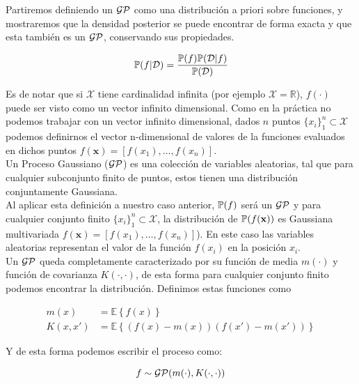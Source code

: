 Partiremos definiendo un $\mathcal{GP}$ como una distribución a priori sobre funciones, y mostraremos que la densidad posterior se puede encontrar de forma exacta y que esta también es un $\mathcal{GP}$, conservando sus propiedades.

\begin{equation}
	\mathbb{P}(f|\mathcal{D}) =  \frac{\mathbb{P}(f)\mathbb{P}(\mathcal{D}|f)}{\mathbb{P}(\mathcal{D})}
\end{equation}

Es de notar que si $\mathcal{X}$ tiene cardinalidad infinita (por ejemplo $\mathcal{X}=\mathbb{R}$), $f(\cdot)$ puede ser visto como un vector infinito dimensional. Como en la práctica no podemos trabajar con un vector infinito dimensional, dados $n$ puntos $\{ x_i\}_{1}^{n}  \subset \mathcal{X}$ podemos definirnos el vector n-dimensional de valores de la funciones evaluados en dichos puntos $f(\mathbf{x})=[f(x_1), \ldots, f(x_n)]$.\\


 Un Proceso Gaussiano ($\mathcal{GP}$) es una colección de variables aleatorias, tal que para cualquier subconjunto finito de puntos, estos tienen una distribución conjuntamente Gaussiana.\\ 

Al aplicar esta definición a nuestro caso anterior, $\mathbb{P}(f)$ será un $\mathcal{GP}$ y para cualquier conjunto finito $\{ x_i\}_{1}^{n}  \subset \mathcal{X}$, la distribución de $\mathbb{P}(f(\mathbf{x}))$ es Gaussiana multivariada $f(\mathbf{x})=[f(x_1), \ldots, f(x_n)]$). En este caso las variables aleatorias representan el valor de la función $f(x_i)$ en la posición $x_i$.\\


Un $\mathcal{GP}$ queda completamente caracterizado por su función de media $m(\cdot)$ y función de covarianza $K(\cdot, \cdot)$, de esta forma para cualquier conjunto finito podemos encontrar la distribución. Definimos estas funciones como

\begin{align}
	m(x) & = \mathbb{E}\left\{f(x)\right\}\\
	K(x, x') & = \mathbb{E}\left\{\left(f(x) - m(x)\right) \left(f(x') - m(x') \right)\right\}
\end{align}

Y de esta forma podemos escribir el proceso como:

\begin{equation}
	f \sim \mathcal{GP}(m(\cdot), K(\cdot, \cdot))
\end{equation}

